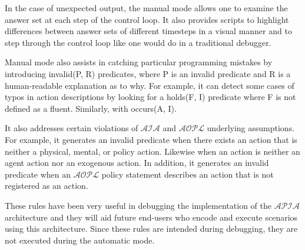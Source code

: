 In the case of unexpected output, the manual mode allows one to examine the answer set at each step of the control loop.
It also provides scripts to highlight differences between answer sets of different timesteps in a visual manner and to step through the control loop like one would do in a traditional debugger.

Manual mode also assists in catching particular programming mistakes by introducing invalid(P, R) predicates, where P is an invalid predicate and R is a human-readable explanation as to why.
For example, it can detect some cases of typos in action descriptions by looking for a holds(F, I) predicate where F is not defined as a fluent.
Similarly, with occurs(A, I).

It also addresses certain violations of $\mathcal{AIA}$ and $\mathcal{AOPL}$ underlying assumptions.
For example, it generates an invalid predicate when there exists an action that is neither a physical, mental, or policy action.
Likewise when an action is neither an agent action nor an exogenous action.
In addition, it generates an invalid predicate when an $\mathcal{AOPL}$ policy statement describes an action that is not registered as an action.

These rules have been very useful in debugging the implementation of the $\mathcal{APIA}$ architecture and they will aid future end-users who encode and execute scenarios using this architecture.
Since these rules are intended during debugging, they are not executed during the automatic mode.
